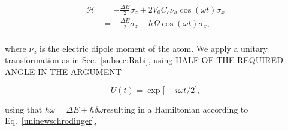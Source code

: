  \[
 	\begin{aligned}
	 	\mathcal{H} & = -\frac{\Delta E}{2}\sigma_z + 2V_0C_c\nu_a\cos(\omega t)\sigma_x\\
	 	& = -\frac{\Delta E}{2}\sigma_z - \hbar\Omega\cos(\omega t)\sigma_x,\\
 	\end{aligned}
 \]
 
 \noindent where $ \nu_a $ is the electric dipole moment of the atom. We apply a unitary transformation as in Sec.~\ref{subsec:Rabi}, \alert{using HALF OF THE REQUIRED ANGLE IN THE ARGUMENT}
 
 \[
 	U(t) = \exp\big[-i\omega t/2\big],
 \]
 
 \noindent \alert{using that $ \hbar\omega = \Delta E + \hbar\delta\omega $}resulting in a Hamiltonian according to Eq.~\eqref{uninewschrodinger},
 
